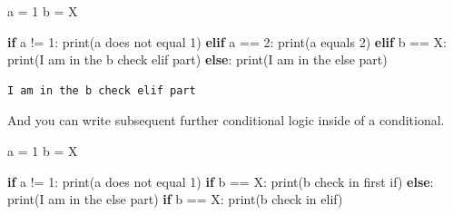 \documentclass[
  letterpaper,
]{scrbook}
\newenvironment{Shaded}{\begin{snugshade}}{\end{snugshade}}
\newcommand{\BuiltInTok}[1]{\textcolor[rgb]{0.00,0.23,0.31}{#1}}
\newcommand{\ControlFlowTok}[1]{\textcolor[rgb]{0.00,0.23,0.31}{\textbf{#1}}}
\newcommand{\DecValTok}[1]{\textcolor[rgb]{0.68,0.00,0.00}{#1}}
\newcommand{\NormalTok}[1]{\textcolor[rgb]{0.00,0.23,0.31}{#1}}
\newcommand{\OperatorTok}[1]{\textcolor[rgb]{0.37,0.37,0.37}{#1}}
\newcommand{\StringTok}[1]{\textcolor[rgb]{0.13,0.47,0.30}{#1}}
\begin{document}
\begin{Shaded}
\begin{Highlighting}[]
\NormalTok{a }\OperatorTok{=} \DecValTok{1}
\NormalTok{b }\OperatorTok{=} \StringTok{\textquotesingle{}X\textquotesingle{}}

\ControlFlowTok{if}\NormalTok{ a }\OperatorTok{!=} \DecValTok{1}\NormalTok{:}
  \BuiltInTok{print}\NormalTok{(}\StringTok{\textquotesingle{}a does not equal 1\textquotesingle{}}\NormalTok{)}
\ControlFlowTok{elif}\NormalTok{ a }\OperatorTok{==} \DecValTok{2}\NormalTok{:}
  \BuiltInTok{print}\NormalTok{(}\StringTok{\textquotesingle{}a equals 2\textquotesingle{}}\NormalTok{)}
\ControlFlowTok{elif}\NormalTok{ b }\OperatorTok{==} \StringTok{\textquotesingle{}X\textquotesingle{}}\NormalTok{:}
  \BuiltInTok{print}\NormalTok{(}\StringTok{\textquotesingle{}I am in the b check elif part\textquotesingle{}}\NormalTok{)}
\ControlFlowTok{else}\NormalTok{:}
  \BuiltInTok{print}\NormalTok{(}\StringTok{\textquotesingle{}I am in the else part\textquotesingle{}}\NormalTok{)}
\end{Highlighting}
\end{Shaded}

\begin{verbatim}
I am in the b check elif part
\end{verbatim}

And you can write subsequent further conditional logic inside of a
conditional.

\begin{Shaded}
\begin{Highlighting}[]
\NormalTok{a }\OperatorTok{=} \DecValTok{1}
\NormalTok{b }\OperatorTok{=} \StringTok{\textquotesingle{}X\textquotesingle{}}

\ControlFlowTok{if}\NormalTok{ a }\OperatorTok{!=} \DecValTok{1}\NormalTok{:}
  \BuiltInTok{print}\NormalTok{(}\StringTok{\textquotesingle{}a does not equal 1\textquotesingle{}}\NormalTok{)}
  \ControlFlowTok{if}\NormalTok{ b }\OperatorTok{==} \StringTok{\textquotesingle{}X\textquotesingle{}}\NormalTok{:}
    \BuiltInTok{print}\NormalTok{(}\StringTok{\textquotesingle{}b check in first if\textquotesingle{}}\NormalTok{)}
\ControlFlowTok{else}\NormalTok{:}
  \BuiltInTok{print}\NormalTok{(}\StringTok{\textquotesingle{}I am in the else part\textquotesingle{}}\NormalTok{)}
  \ControlFlowTok{if}\NormalTok{ b }\OperatorTok{==} \StringTok{\textquotesingle{}X\textquotesingle{}}\NormalTok{:}
    \BuiltInTok{print}\NormalTok{(}\StringTok{\textquotesingle{}b check in elif\textquotesingle{}}\NormalTok{)}
\end{Highlighting}
\end{Shaded}
\end{document}
